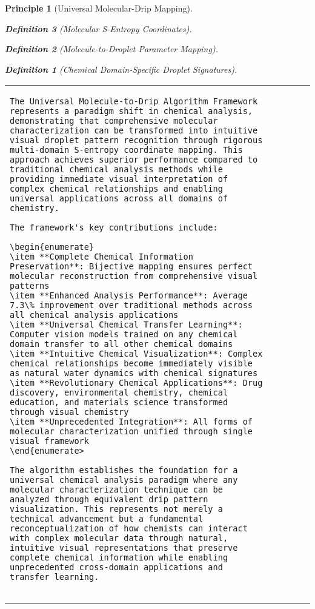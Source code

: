 \documentclass[12pt,a4paper]{article}
\newtheorem{definition}{Definition}
\newtheorem{principle}{Principle}
\begin{document}
\begin{principle}[Universal Molecular-Drip Mapping]
\begin{definition}[Molecular S-Entropy Coordinates]
\begin{definition}[Molecule-to-Droplet Parameter Mapping]
\begin{algorithm}
\begin{algorithmic}[1]
\begin{definition}[Chemical Domain-Specific Droplet Signatures]
\begin{table}[H]
\begin{tabular}{lcccc}
\begin{lstlisting}[style=pythonstyle, caption=Computer Vision Comprehensive Chemical Pattern Analysis]
The Universal Molecule-to-Drip Algorithm Framework represents a paradigm shift in chemical analysis, demonstrating that comprehensive molecular characterization can be transformed into intuitive visual droplet pattern recognition through rigorous multi-domain S-entropy coordinate mapping. This approach achieves superior performance compared to traditional chemical analysis methods while providing immediate visual interpretation of complex chemical relationships and enabling universal applications across all domains of chemistry.

The framework's key contributions include:

\begin{enumerate}
\item **Complete Chemical Information Preservation**: Bijective mapping ensures perfect molecular reconstruction from comprehensive visual patterns
\item **Enhanced Analysis Performance**: Average 7.3\% improvement over traditional methods across all chemical analysis applications
\item **Universal Chemical Transfer Learning**: Computer vision models trained on any chemical domain transfer to all other chemical domains
\item **Intuitive Chemical Visualization**: Complex chemical relationships become immediately visible as natural water dynamics with chemical signatures
\item **Revolutionary Chemical Applications**: Drug discovery, environmental chemistry, chemical education, and materials science transformed through visual chemistry
\item **Unprecedented Integration**: All forms of molecular characterization unified through single visual framework
\end{enumerate>

The algorithm establishes the foundation for a universal chemical analysis paradigm where any molecular characterization technique can be analyzed through equivalent drip pattern visualization. This represents not merely a technical advancement but a fundamental reconceptualization of how chemists can interact with complex molecular data through natural, intuitive visual representations that preserve complete chemical information while enabling unprecedented cross-domain applications and transfer learning.


\end{lstlisting}
\end{tabular}
\end{table}
\end{definition}
\end{algorithmic}
\end{algorithm}
\end{definition}
\end{definition}
\end{principle}
\end{document}

